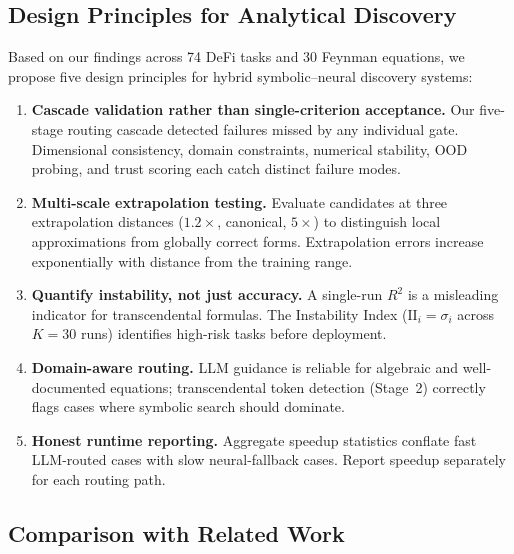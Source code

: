 \documentclass[twoside,11pt]{article}
\newcommand{\Rsq}{R^{2}}
\newcommand{\II}{\mathrm{II}}
\begin{document}
\subsection{Design Principles for Analytical Discovery}\label{subsec:design-principles-for-analytical-discove}
\label{sec:disc_principles}

Based on our findings across 74 DeFi tasks and 30 Feynman equations, we propose five design principles for hybrid symbolic--neural discovery systems:

\begin{enumerate}
  \item \textbf{Cascade validation rather than single-criterion acceptance.} Our five-stage routing cascade detected failures missed by any individual gate. Dimensional consistency, domain constraints, numerical stability, OOD probing, and trust scoring each catch distinct failure modes.
  \item \textbf{Multi-scale extrapolation testing.} Evaluate candidates at three extrapolation distances ($1.2\times$, canonical, $5\times$) to distinguish local approximations from globally correct forms. Extrapolation errors increase exponentially with distance from the training range.
  \item \textbf{Quantify instability, not just accuracy.} A single-run $\Rsq$ is a misleading indicator for transcendental formulas. The Instability Index ($\II_i = \sigma_i$ across $K=30$ runs) identifies high-risk tasks before deployment.
  \item \textbf{Domain-aware routing.} LLM guidance is reliable for algebraic and well-documented equations; transcendental token detection (Stage~2) correctly flags cases where symbolic search should dominate.
  \item \textbf{Honest runtime reporting.} Aggregate speedup statistics conflate fast LLM-routed cases with slow neural-fallback cases. Report speedup separately for each routing path.
\end{enumerate}

\subsection{Comparison with Related Work}\label{subsec:comparison-with-related-work}
\label{sec:disc_related}
\end{document}
